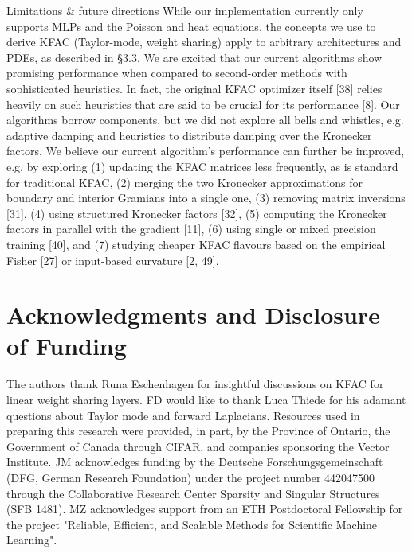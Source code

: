 \documentclass[10pt]{article}
\begin{document}
Limitations \& future directions While our implementation currently only supports MLPs and the Poisson and heat equations, the concepts we use to derive KFAC (Taylor-mode, weight sharing) apply to arbitrary architectures and PDEs, as described in §3.3. We are excited that our current algorithms show promising performance when compared to second-order methods with sophisticated heuristics. In fact, the original KFAC optimizer itself [38] relies heavily on such heuristics that are said to be crucial for its performance [8]. Our algorithms borrow components, but we did not explore all bells and whistles, e.g. adaptive damping and heuristics to distribute damping over the Kronecker factors. We believe our current algorithm's performance can further be improved, e.g. by exploring (1) updating the KFAC matrices less frequently, as is standard for traditional KFAC, (2) merging the two Kronecker approximations for boundary and interior Gramians into a single one, (3) removing matrix inversions [31], (4) using structured Kronecker factors [32], (5) computing the Kronecker factors in parallel with the gradient [11], (6) using single or mixed precision training [40], and (7) studying cheaper KFAC flavours based on the empirical Fisher [27] or input-based curvature [2, 49].

\section*{Acknowledgments and Disclosure of Funding}
The authors thank Runa Eschenhagen for insightful discussions on KFAC for linear weight sharing layers. FD would like to thank Luca Thiede for his adamant questions about Taylor mode and forward Laplacians. Resources used in preparing this research were provided, in part, by the Province of Ontario, the Government of Canada through CIFAR, and companies sponsoring the Vector Institute. JM acknowledges funding by the Deutsche Forschungsgemeinschaft (DFG, German Research Foundation) under the project number 442047500 through the Collaborative Research Center Sparsity and Singular Structures (SFB 1481). MZ acknowledges support from an ETH Postdoctoral Fellowship for the project "Reliable, Efficient, and Scalable Methods for Scientific Machine Learning".
\end{document}
